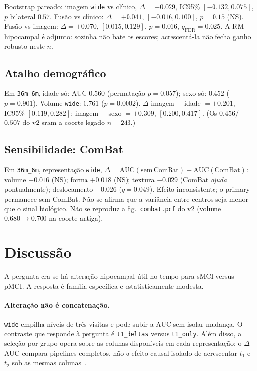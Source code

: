 \documentclass[review]{elsarticle}
\newcommand{\code}[1]{\texttt{#1}}
\begin{document}
Bootstrap pareado: imagem \code{wide} vs clínico, $\Delta=-0.029$, IC95\% $[-0.132,0.075]$, $p$ bilateral $0.57$.
Fusão vs clínico: $\Delta=+0.041$, $[-0.016,0.100]$, $p=0.15$ (NS).
Fusão vs imagem: $\Delta=+0.070$, $[0.015,0.129]$, $p=0.016$, $q_{\mathrm{FDR}}=0.025$.
A RM hipocampal é adjunto: sozinha não bate os escores; acrescentá-la não fecha ganho robusto neste $n$.

\subsection{Atalho demográfico}

Em \code{36m\_6m}, idade só: AUC $0.560$ (permutação $p=0.057$); sexo só: $0.452$ ($p=0.901$).
Volume \code{wide}: $0.761$ ($p=0.0002$).
$\Delta$ imagem $-$ idade $=+0.201$, IC95\% $[0.119,0.282]$; imagem $-$ sexo $=+0.309$, $[0.200,0.417]$.
(Os $0.456$/$0.507$ do v2 eram a coorte legado $n=243$.)

\subsection{Sensibilidade: ComBat}

Em \code{36m\_6m}, representação \code{wide},
$\Delta=\mathrm{AUC}(\mathrm{sem\,ComBat})-\mathrm{AUC}(\mathrm{ComBat})$:
volume $+0.016$ (NS); forma $+0.018$ (NS); textura $-0.029$ (ComBat \emph{ajuda} pontualmente); deslocamento $+0.026$ ($q=0.049$).
Efeito inconsistente; o primary permanece sem ComBat.
Não se afirma que a variância entre centros seja menor que o sinal biológico.
Não se reproduz a fig.\ \code{combat.pdf} do v2 (volume $0.680\to0.700$ na coorte antiga).
	\section{Discussão}
	\label{sec:discussao}
	
	A pergunta era se há alteração hipocampal útil no tempo para sMCI versus pMCI.
	A resposta é família-específica e estatisticamente modesta.
	
	\paragraph{Alteração não é concatenação.}
	\code{wide} empilha níveis de três visitas e pode subir a AUC sem isolar mudança.
	O contraste que responde à pergunta é \code{t1\_deltas} versus \code{t1\_only}.
	Além disso, a seleção por grupo opera sobre as colunas disponíveis em cada representação: o $\Delta$AUC compara pipelines completos, não o efeito causal isolado de acrescentar $t_1$ e $t_2$ sob as mesmas colunas~\cite{meinshausen-2010}.
	
\end{document}
